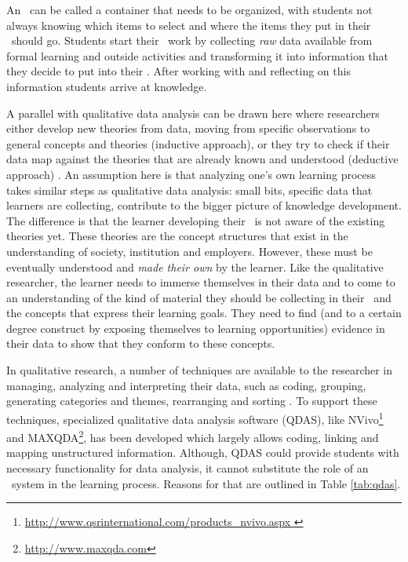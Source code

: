 An \ep~can be called a container that needs to be organized, with students not
always knowing which items to select and where the items they put in their
\ep~should go. Students start their \ep~work by collecting \textit{raw} data
available from formal learning and outside activities and transforming it into
information that they decide to put into their \ep. After working with and
reflecting on this information students arrive at knowledge. 

A parallel with qualitative data analysis can be drawn here where researchers
either develop new theories from data, moving from specific observations to
general concepts and theories (inductive approach), or they try to check if
their data map against the theories that are already known and understood
(deductive approach) \citep{Strauss2008,Patton2002}. An assumption here is that
analyzing one's own learning process takes similar steps as qualitative data
analysis: small bits, specific data that learners are collecting, contribute to
the bigger picture of knowledge development. The difference is that the learner
developing their \ep~is not aware of the existing theories yet. These theories
are the concept structures that exist in the understanding of society,
institution and employers. However, these must be eventually understood and
\textit{made their own} by the learner. Like the qualitative researcher, the
learner needs to immerse themselves in their data and to come to an
understanding of the kind of material they should be collecting in their \ep~and
the concepts that express their learning goals. They need to find (and to a
certain degree construct by exposing themselves to learning opportunities)
evidence in their data to show that they conform to these concepts.

In qualitative research, a number of techniques are available to the researcher
in managing, analyzing and interpreting their data, such as coding, grouping,
generating categories and themes, rearranging and sorting \citep{Marshall2010}.
To support these techniques, specialized qualitative data analysis software
(QDAS), like
NVivo\footnote{\url{http://www.qsrinternational.com/products_nvivo.aspx }} and
MAXQDA\footnote{\url{http://www.maxqda.com}}, has been developed which largely
allows coding, linking and mapping unstructured information. Although, QDAS
could provide students with necessary functionality for data analysis, it cannot
substitute the role of an \ep~system in the learning process. Reasons for
that are outlined in Table \ref{tab:qdas}.

